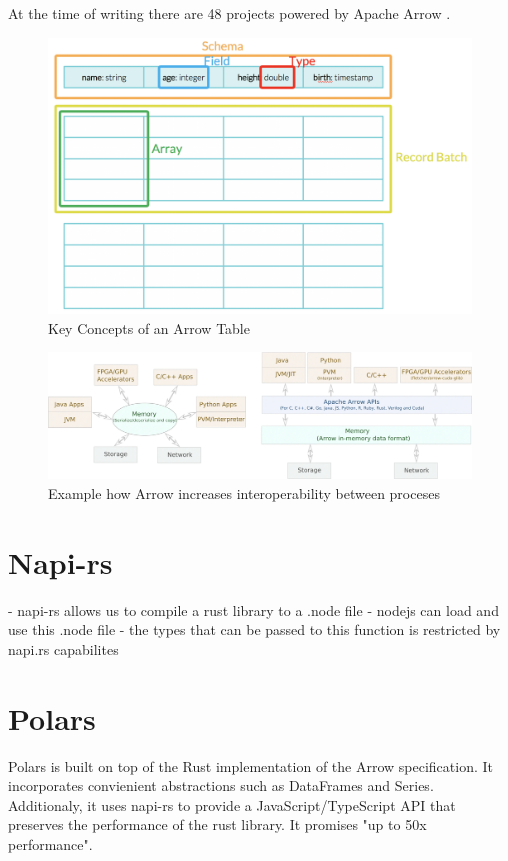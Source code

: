 At the time of writing there are 48 projects powered by Apache Arrow \autocite{arrow:projects}.

\begin{figure}
	\includegraphics[width=\textwidth]{resources/arrow_tab}
	\caption{Key Concepts of an Arrow Table \autocite{Dremio}}
	\label{fig:arrow_tab}
\end{figure}
\begin{figure}
	\includegraphics[width=\textwidth]{resources/arrow_interop}
	\caption{Example how Arrow increases interoperability between proceses \autocite{Ahmad2020}}
	\label{fig:arrow_com}
\end{figure}

\section{Napi-rs}
- napi-rs allows us to compile a rust library to a .node file
- nodejs can load and use this .node file
- the types that can be passed to this function is restricted by napi.rs capabilites


\section{Polars}
\label{section:polars}
Polars is built on top of the Rust implementation of the Arrow specification.
It incorporates convienient abstractions such as DataFrames and Series.
Additionaly, it uses napi-rs to provide a JavaScript/TypeScript \ac{API} that preserves the performance of the rust library.
It promises "up to 50x performance".
\autocite{polars}

